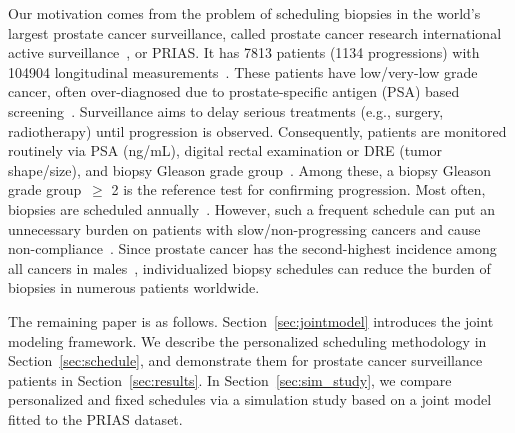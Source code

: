 Our motivation comes from the problem of scheduling biopsies in the world's largest prostate cancer surveillance, called prostate cancer research international active surveillance~\citep{bokhorst2015compliance}, or PRIAS. It has 7813 patients (1134 progressions) with 104904 longitudinal measurements~\citep{tomer2020webapp}. These patients have low/very-low grade cancer, often over-diagnosed due to prostate-specific antigen (PSA) based screening~\citep{loeb2014overdiagnosis}. Surveillance aims to delay serious treatments (e.g., surgery, radiotherapy) until progression is observed. Consequently, patients are monitored routinely via PSA (ng/mL), digital rectal examination or DRE (tumor shape/size), and biopsy Gleason grade group~\citep{epsteinGG2014}. Among these, a biopsy Gleason grade group~$\geq$ 2 is the reference test for confirming progression. Most often, biopsies are scheduled annually~\citep{loeb2014heterogeneity}. However, such a frequent schedule can put an unnecessary burden on patients with slow/non-progressing cancers and cause non-compliance~\citep{bokhorst2015compliance}. Since prostate cancer has the second-highest incidence among all cancers in males~\citep{GlobalCancerStats2012}, individualized biopsy schedules can reduce the burden of biopsies in numerous patients worldwide.

The remaining paper is as follows. Section~\ref{sec:jointmodel} introduces the joint modeling framework. We describe the personalized scheduling methodology in Section~\ref{sec:schedule}, and demonstrate them for prostate cancer surveillance patients in Section~\ref{sec:results}. In Section~\ref{sec:sim_study}, we compare personalized and fixed schedules via a simulation study based on a joint model fitted to the PRIAS dataset.